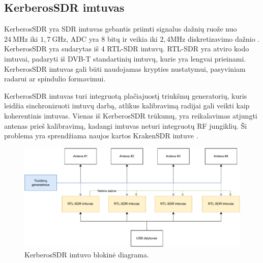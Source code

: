\documentclass[main.tex]{subfiles}
\begin{document}
\subsection{KerberosSDR imtuvas}\label{sec:kerberossdr}

KerberosSDR yra SDR imtuvas gebantis priimti signalus dažnių ruože nuo $24\ \mathrm{MHz}$
iki $1,7\ \mathrm{GHz}$, ADC yra 8 bitų ir veikia iki $2,4 \mathrm{MHz}$ diskretizavimo dažnio
\cite{kerberossdr}.
KerberosSDR yra sudarytas iš 4 RTL-SDR imtuvų. RTL-SDR yra atviro kodo imtuvai, padaryti iš
DVB-T standartinių imtuvų, kurie yra lengvai prieinami. KerberosSDR imtuvas
gali būti naudojamas krypties nustatymui, pasyviniam radarui ar spindulio formavimui.

KerberosSDR imtuvas turi integruotą plačiajuostį triukšmų generatorių, kuris leidžia
sin\-chro\-ni\-zuo\-ti imtuvų darbą, atlikus kalibravimą radijai gali veikti kaip koherentinis imtuvas.
Vienas iš KerberosSDR trūkumų, yra reikalavimas atjungti antenas prieš kalibravimą, kadangi
imtuvas neturi integruotų RF jungiklių. Ši problema yra sprendžiama naujos kartos KrakenSDR
imtuve \cite{krakensdr}.

\begin{figure}[h]
    \begin{centering}
    \includegraphics[scale=0.8]{drawings/kerberos_sdr_blockdiagram}
    \par\end{centering}
    \protect\caption{\label{fig:kerberos_block}KerberosSDR imtuvo blokinė diagrama.}
\end{figure}
\end{document}
